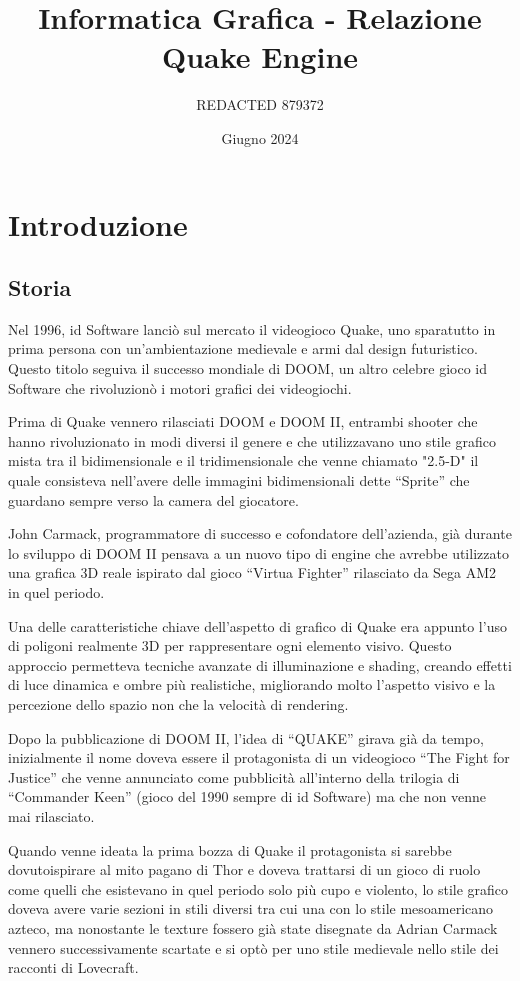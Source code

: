 \documentclass[12pt, letterpaper]{article}
\begin{document}
\title{Informatica Grafica - Relazione Quake Engine}
\author{REDACTED 879372}
\date{Giugno 2024}
\maketitle
\tableofcontents

\section{Introduzione}

\subsection{Storia}
Nel 1996, id Software lanciò sul mercato il videogioco Quake, uno sparatutto in prima persona con un'ambientazione medievale e armi dal design futuristico. Questo titolo seguiva il successo mondiale di DOOM, un altro celebre gioco id Software che rivoluzionò i motori grafici dei videogiochi.

Prima di Quake vennero rilasciati DOOM e DOOM II, entrambi shooter che hanno rivoluzionato in modi diversi il genere e che utilizzavano uno stile grafico mista tra il bidimensionale e il tridimensionale che venne chiamato "2.5-D" il quale consisteva nell'avere delle immagini bidimensionali dette ``Sprite'' che guardano sempre verso la camera del giocatore.

John Carmack, programmatore di successo e cofondatore dell'azienda, già durante lo sviluppo di DOOM II pensava a un nuovo tipo di engine che avrebbe utilizzato una grafica 3D reale ispirato dal gioco ``Virtua Fighter'' rilasciato da Sega AM2 in quel periodo.

Una delle caratteristiche chiave dell'aspetto di grafico di Quake era appunto l'uso di poligoni realmente 3D per rappresentare ogni elemento visivo. Questo approccio permetteva tecniche avanzate di illuminazione e shading, creando effetti di luce dinamica e ombre più realistiche, migliorando molto l'aspetto visivo e la percezione dello spazio non che la velocità di rendering. \cite{laidlaw_1996}

Dopo la pubblicazione di DOOM II, l'idea di ``QUAKE'' girava già da tempo, inizialmente il nome doveva essere il protagonista di un videogioco ``The Fight for Justice'' che venne annunciato come pubblicità all'interno della trilogia di ``Commander Keen'' (gioco del 1990 sempre di id Software) ma che non venne mai rilasciato. 

Quando venne ideata la prima bozza di Quake il protagonista si sarebbe dovutoispirare al mito pagano di Thor e doveva trattarsi di un gioco di ruolo come quelli che esistevano in quel periodo solo più cupo e violento, lo stile grafico doveva avere varie sezioni in stili diversi tra cui una con lo stile mesoamericano azteco, ma nonostante le texture fossero già state disegnate da Adrian Carmack vennero successivamente scartate e si optò per uno stile medievale nello stile dei racconti di Lovecraft.
\end{document}
